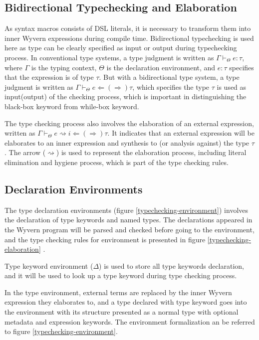 \documentclass{sig-alternate}
\begin{document}
\subsection{Bidirectional Typechecking and Elaboration}
As syntax macros consists of DSL literals, it is necessary to transform them into inner Wyvern expressions during compile time. Bidirectional typechecking is used here as type can be clearly specified as input or output during typechecking process. In conventional type systems, a type judgment is written as $\Gamma\vdash_{\Theta} e:\tau$, where $\Gamma$ is the typing context, $\Theta$ is the declaration environment, and $e:\tau$ specifies that the expression is of type $\tau$. But with a bidirectional type system, a type judgment is written as $\Gamma\vdash_{\Theta} e\Leftarrow(\Rightarrow)\tau$, which specifies the type $\tau$ is used as input(output) of the checking process, which is important in distinguishing the black-box keyword from while-box keyword.
\par
The type checking process also involves the elaboration of an external expression, written as $\Gamma\vdash_{\Theta} e\rightsquigarrow i \Leftarrow(\Rightarrow) \tau$. It indicates that an external expression will be elaborates to an inner expression and synthesis to (or analysis against) the type $\tau$. The arrow ($\rightsquigarrow$) is used to represent the elaboration process, including literal elimination and hygiene process, which is part of the type checking rules.

\subsection{Declaration Environments}
The type declaration environments (figure \ref{typechecking-environment}) involves the declaration of type keywords and named types. The declarations appeared in the Wyvern program will be parsed and checked before going to the environment, and the type checking rules for environment is presented in figure \ref{typechecking-elaboration} . 

Type keyword environment ($\Delta$) is used to store all type keywords declaration, and it will be used to look up a type keyword during type checking process.

In the type environment, external terms are replaced by the inner Wyvern expression they elaborates to, and a type declared with type keyword goes into the environment with its structure presented as a normal type with optional metadata and expression keywords. The environment formalization an be referred to figure \ref{typechecking-environment}.
\end{document}
